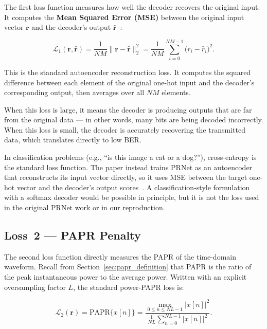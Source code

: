 The first loss function measures how well the decoder recovers the original
input.  It computes the \textbf{Mean Squared Error (MSE)} between the
original input vector $\bm{r}$ and the decoder's output
$\hat{\bm{r}}$~\cite{kim2017novel}:

\begin{equation}
    \boxed{\mathcal{L}_1(\bm{r},\hat{\bm{r}})
    = \frac{1}{NM}\|\bm{r} - \hat{\bm{r}}\|_2^2
    = \frac{1}{NM}\sum_{i=0}^{NM-1}\bigl(r_i - \hat{r}_i\bigr)^2.}
    \label{eq:prnet_L1}
\end{equation}

This is the standard autoencoder reconstruction loss.  It computes the
squared difference between each element of the original one-hot input
and the decoder's corresponding output, then averages over all $NM$
elements.

When this loss is large, it means the decoder is producing outputs that
are far from the original data --- in other words, many bits are being
decoded incorrectly.  When this loss is small, the decoder is accurately
recovering the transmitted data, which translates directly to low BER.

\begin{keyinsight}
    In classification problems (e.g., ``is this image a cat or a dog?''),
    cross-entropy is the standard loss function.  The paper instead trains
    PRNet as an autoencoder that reconstructs its input vector directly, so
    it uses MSE between the target one-hot vector and the decoder's output
    scores~\cite{kim2017novel}.  A classification-style formulation with a
    softmax decoder would be possible in principle, but it is not the loss
    used in the original PRNet work or in our reproduction.
\end{keyinsight}


\subsection{Loss~2 --- PAPR Penalty}

The second loss function directly measures the PAPR of the time-domain
waveform.  Recall from Section~\ref{sec:papr_definition} that PAPR is
the ratio of the peak instantaneous power to the average power.  Written with
an explicit oversampling factor $L$, the standard power-PAPR loss is:

\begin{equation}
    \boxed{\mathcal{L}_2(\bm{r})
    = \mathrm{PAPR}\{x[n]\}
    = \frac{\displaystyle\max_{0 \le n \le NL-1} |x[n]|^2}
           {\displaystyle\frac{1}{NL}\sum_{n=0}^{NL-1}|x[n]|^2}.}
    \label{eq:prnet_L2}
\end{equation}

